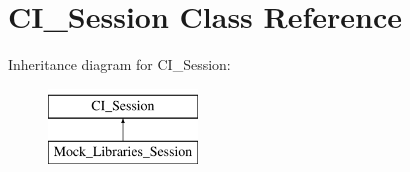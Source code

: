 \hypertarget{class_c_i___session}{}\section{C\+I\+\_\+\+Session Class Reference}
\label{class_c_i___session}
Inheritance diagram for C\+I\+\_\+\+Session\+:\begin{figure}[H]
\begin{center}
\leavevmode
\includegraphics[height=2.000000cm]{class_c_i___session}
\end{center}
\end{figure}
